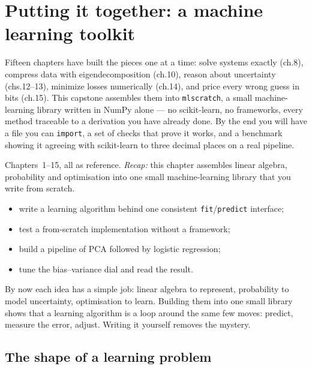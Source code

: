\chapter{Putting it together: a machine learning toolkit}\label{ch:mlscratch}

Fifteen chapters have built the
pieces one at a time: solve systems exactly (ch.8), compress data with
eigendecomposition (ch.10), reason about uncertainty (chs.12--13),
minimize losses numerically (ch.14), and price every wrong guess in
bits (ch.15). This capstone assembles them into \texttt{mlscratch}, a
small machine-learning library written in NumPy alone --- no
scikit-learn, no frameworks, every method traceable to a derivation
you have already done. By the end you will have a file you can
\texttt{import}, a set of checks that prove it works, and a benchmark
showing it agreeing with scikit-learn to three decimal places on a
real pipeline.

\begin{rulebox}
Chapters~1--15, all as reference. \emph{Recap:} this chapter assembles linear algebra, probability and optimisation into one small machine-learning library that you write from scratch.
\end{rulebox}
\begin{wins}
\begin{itemize}
\item write a learning algorithm behind one consistent \texttt{fit}/\texttt{predict} interface;
\item test a from-scratch implementation without a framework;
\item build a pipeline of PCA followed by logistic regression;
\item tune the bias--variance dial and read the result.
\end{itemize}
\end{wins}
\begin{principle}
By now each idea has a simple job: linear algebra to represent, probability to model uncertainty, optimisation to learn. Building them into one small library shows that a learning algorithm is a loop around the same few moves: predict, measure the error, adjust. Writing it yourself removes the mystery.
\end{principle}

\section{The shape of a learning problem}\label{sec:shape}

